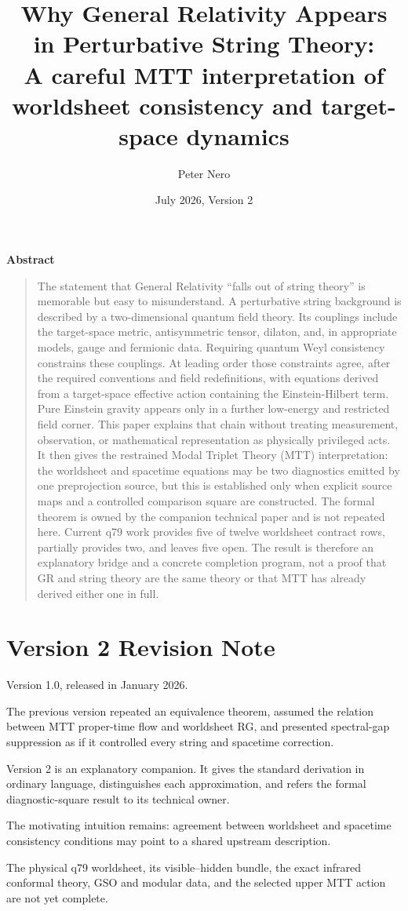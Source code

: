 \documentclass[11pt]{article}
\title{\textbf{Why General Relativity Appears in Perturbative String Theory:}\\
\large A careful MTT interpretation of worldsheet consistency and target-space dynamics}
\author{Peter Nero}
\date{July 2026, Version 2}
\renewenvironment{abstract}
  {\begin{center}\textbf{Abstract}\end{center}\begin{quote}\small}
  {\end{quote}}
\begin{document}
\maketitle

\begin{abstract}
The statement that General Relativity ``falls out of string theory'' is
memorable but easy to misunderstand.  A perturbative string background is
described by a two-dimensional quantum field theory.  Its couplings include
the target-space metric, antisymmetric tensor, dilaton, and, in appropriate
models, gauge and fermionic data.  Requiring quantum Weyl consistency
constrains these couplings.  At leading order those constraints agree, after
the required conventions and field redefinitions, with equations derived
from a target-space effective action containing the Einstein-Hilbert term.
Pure Einstein gravity appears only in a further low-energy and restricted
field corner.  This paper explains that chain without treating measurement,
observation, or mathematical representation as physically privileged acts.
It then gives the restrained Modal Triplet Theory (MTT) interpretation: the
worldsheet and spacetime equations may be two diagnostics emitted by one
preprojection source, but this is established only when explicit source maps
and a controlled comparison square are constructed.  The formal theorem is
owned by the companion technical paper and is not repeated here.  Current
q79 work provides five of twelve worldsheet contract rows, partially provides
two, and leaves five open.  The result is therefore an explanatory bridge and
a concrete completion program, not a proof that GR and string theory are the
same theory or that MTT has already derived either one in full.
\end{abstract}

\section*{Version 2 Revision Note}
\begin{description}[leftmargin=2.8cm,style=nextline]
\item[Supersedes] Version 1.0, released in January 2026.
\item[Reason] The previous version repeated an equivalence theorem, assumed
the relation between MTT proper-time flow and worldsheet RG, and presented
spectral-gap suppression as if it controlled every string and spacetime
correction.
\item[Resolution] Version 2 is an explanatory companion.  It gives the
standard derivation in ordinary language, distinguishes each approximation,
and refers the formal diagnostic-square result to its technical owner.
\item[Retained content] The motivating intuition remains: agreement between
worldsheet and spacetime consistency conditions may point to a shared
upstream description.
\item[Open boundary] The physical q79 worldsheet, its visible--hidden bundle,
the exact infrared conformal theory, GSO and modular data, and the selected
upper MTT action are not yet complete.
\end{description}
\end{document}
